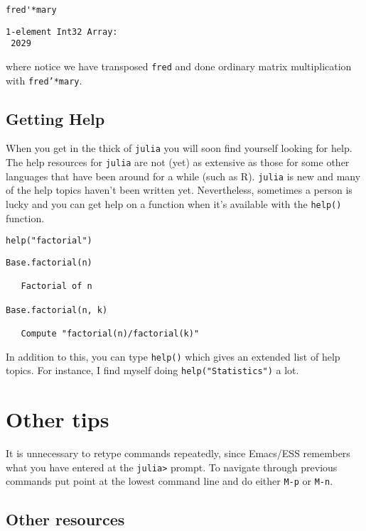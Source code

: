 \documentclass[11pt]{article}
\begin{document}
\begin{verbatim}
fred'*mary
\end{verbatim}

\begin{verbatim}
1-element Int32 Array:
 2029
\end{verbatim}

where notice we have transposed \texttt{fred} and done ordinary matrix
multiplication with \texttt{fred'*mary}.
\subsection[Getting Help]{Getting Help}
\label{sec-2-3}

When you get in the thick of \texttt{julia} you will soon find yourself
looking for help. The help resources for \texttt{julia} are not (yet) as
extensive as those for some other languages that have been around for
a while (such as R).  \texttt{julia} is new and many of the help topics
haven't been written yet.  Nevertheless, sometimes a person is lucky
and you can get help on a function when it's available with the
\texttt{help()} function.

\begin{verbatim}
help("factorial")
\end{verbatim}

\begin{verbatim}
Base.factorial(n)

   Factorial of n

Base.factorial(n, k)

   Compute "factorial(n)/factorial(k)"
\end{verbatim}

In addition to this, you can type \texttt{help()} which gives an extended
list of help topics.  For instance, I find myself doing
\texttt{help("Statistics")} a lot.
\section[Other tips]{Other tips}
\label{sec-3}

It is unnecessary to retype commands repeatedly, since Emacs/ESS
remembers what you have entered at the \texttt{julia>} prompt. To navigate
through previous commands put point at the lowest command line and
do either \texttt{M-p} or \texttt{M-n}.

\subsection[Other resources]{Other resources}
\label{sec-3-1}
\end{document}
